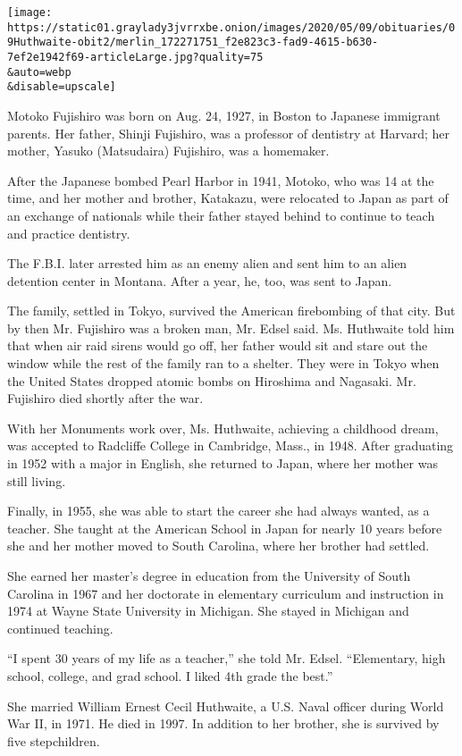 \texttt{[image: https://static01.graylady3jvrrxbe.onion/images/2020/05/09/obituaries/09Huthwaite-obit2/merlin\_172271751\_f2e823c3-fad9-4615-b630-7ef2e1942f69-articleLarge.jpg?quality=75\\\&auto=webp\\\&disable=upscale]}

Motoko Fujishiro was born on Aug. 24, 1927, in Boston to Japanese
immigrant parents. Her father, Shinji Fujishiro, was a professor of
dentistry at Harvard; her mother, Yasuko (Matsudaira) Fujishiro, was a
homemaker.

After the Japanese bombed Pearl Harbor in 1941, Motoko, who was 14 at
the time, and her mother and brother, Katakazu, were relocated to Japan
as part of an exchange of nationals while their father stayed behind to
continue to teach and practice dentistry.

The F.B.I. later arrested him as an enemy alien and sent him to an alien
detention center in Montana. After a year, he, too, was sent to Japan.

The family, settled in Tokyo, survived the American firebombing of that
city. But by then Mr. Fujishiro was a broken man, Mr. Edsel said. Ms.
Huthwaite told him that when air raid sirens would go off, her father
would sit and stare out the window while the rest of the family ran to a
shelter. They were in Tokyo when the United States dropped atomic bombs
on Hiroshima and Nagasaki. Mr. Fujishiro died shortly after the war.

With her Monuments work over, Ms. Huthwaite, achieving a childhood
dream, was accepted to Radcliffe College in Cambridge, Mass., in 1948.
After graduating in 1952 with a major in English, she returned to Japan,
where her mother was still living.

Finally, in 1955, she was able to start the career she had always
wanted, as a teacher. She taught at the American School in Japan for
nearly 10 years before she and her mother moved to South Carolina, where
her brother had settled.

She earned her master's degree in education from the University of South
Carolina in 1967 and her doctorate in elementary curriculum and
instruction in 1974 at Wayne State University in Michigan. She stayed in
Michigan and continued teaching.

``I spent 30 years of my life as a teacher,'' she told Mr. Edsel.
``Elementary, high school, college, and grad school. I liked 4th grade
the best.''

She married William Ernest Cecil Huthwaite, a U.S. Naval officer during
World War II, in 1971. He died in 1997. In addition to her brother, she
is survived by five stepchildren.

